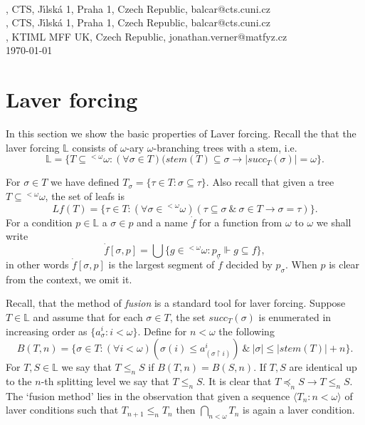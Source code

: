 \documentclass[a4paper,11pt,oneside]{mybook}
\def\force{\Vdash}
\theoremstyle{theorem}
\theoremstyle{example}
\begin{document}
\cfoot{}\rhead{\thepage}

 \\[0.1cm]

, {\small CTS, J{\' \i}lsk{\' a} 1, Praha 1,
	Czech Republic, {\ttfamily balcar@cts.cuni.cz} } \\[0.1cm]
, {\small CTS, J{\' \i}lsk{\' a} 1, Praha 1,
	Czech Republic, {\ttfamily balcar@cts.cuni.cz} } \\[0.1cm]
, {\small KTIML MFF UK,
	Czech Republic, {\ttfamily jonathan.verner@matfyz.cz} }\\[0.1cm]
{\tiny \today } \\[0.5cm]


\thispagestyle{empty}

\section{Laver forcing}

In this section we show the basic properties of Laver forcing. Recall the that the laver forcing $\mathbb{L}$ consists of $\omega$-ary $\omega$-branching
trees with a stem, i.e.
$$
\mathbb{L}=\{T\subseteq {}^{<\omega}\omega:(\forall \sigma\in T)(stem(T)\subseteq \sigma\rightarrow |succ_{T}(\sigma)|=\omega\}.
$$

For $\sigma\in T$ we have defined $T_\sigma=\{\tau\in T:\sigma\subseteq \tau\}$. Also recall that given a tree $T\subseteq{}^{<\omega}\omega$, the set of leafs is
$$
Lf(T)=\{\tau\in T:(\forall\sigma\in{}^{<\omega}\omega)(\tau\subseteq\sigma\ \&\ \sigma\in T\rightarrow \sigma=\tau)\}.
$$
For a condition $p\in \mathbb{L}$ a $\sigma\in p$ and a name $\dot{f}$ for a function from $\omega$ to $\omega$ we shall write
$$
\dot{f}[\sigma,p]=\bigcup\{g\in{}^{<\omega}\omega:p_\sigma\force g\subseteq f\},
$$
in other words $\dot{f}[\sigma,p]$ is the largest segment of $\dot{f}$ decided by $p_\sigma$. When $p$ is clear from the context, we omit it.

Recall, that the method of \emph{fusion} is a standard tool for laver forcing. Suppose $T\in\mathbb{L}$ and assume that for each $\sigma\in T$,
the set $succ_T(\sigma)$ is enumerated in increasing order as $\{a_\sigma^i:i<\omega\}$. Define for $n<\omega$ the following
$$
B(T,n)=\{\sigma\in T:(\forall i <\omega)(\sigma(i)\leq a_(\sigma\upharpoonright i)^i)\ \&\ |\sigma|\leq|stem(T)|+n\}.
$$
For $T,S\in\mathbb{L}$ we say that $T\leq_n S$ if $B(T,n)=B(S,n)$. If $T,S$ are identical up to the $n$-th splitting level we say that
$T\leq_n S$. It is clear that $T\preceq_n S\rightarrow T\leq_n S$. The `fusion method' lies in the observation that given a sequence $\langle T_n:n<\omega\rangle$
of laver conditions such that $T_{n+1}\leq_n T_n$ then $\bigcap_{n<\omega} T_n$ is again a laver condition.
\end{document}
